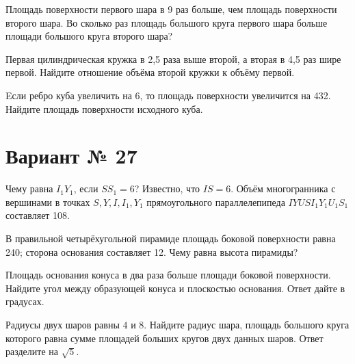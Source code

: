 \documentclass[4apaper]{article}
\begin{document}
\begin{taskBN}{4}
Площадь поверхности первого шара в 9 раз больше, чем площадь поверхности второго шара. Во сколько раз площадь большого круга первого шара больше площади большого круга второго шара?
\end{taskBN}

\begin{taskBN}{5}
 Первая цилиндрическая кружка в 2,5 раза выше второй, а вторая в 4,5 раз шире первой. Найдите отношение объёма второй кружки к объёму первой.
\end{taskBN}

\begin{taskBN}{6}
Eсли ребро куба увеличить на 6, то площадь поверхности увеличится на 432. Найдите площадь поверхности исходного куба.
\end{taskBN}
\newpage\section*{Вариант № 27}

\begin{taskBN}{1}
Чему равна  $I_1Y_1$, если $SS_1=6$? Известно, что  $IS=6$. Объём многогранника с вершинами в точках $S,Y,I,I_1,Y_1$ прямоугольного параллелепипеда $IYUSI_1Y_1U_1S_1$ составляет 108. 
\end{taskBN}

\begin{taskBN}{2}
В правильной четырёхугольной пирамиде площадь боковой поверхности равна 240; сторона основания составляет 12. Чему равна высота пирамиды?
\end{taskBN}

\begin{taskBN}{3}
Площадь основания конуса в два раза больше площади боковой поверхности. Найдите угол между образующей конуса и плоскостью основания. Ответ дайте в градусах.
\end{taskBN}

\begin{taskBN}{4}
Радиусы двух шаров равны $4$ и $8$. Найдите радиус шара, площадь большого круга которого равна сумме площадей больших кругов двух данных шаров. Ответ разделите на $\sqrt{5}$.
\end{taskBN}
\end{document}
